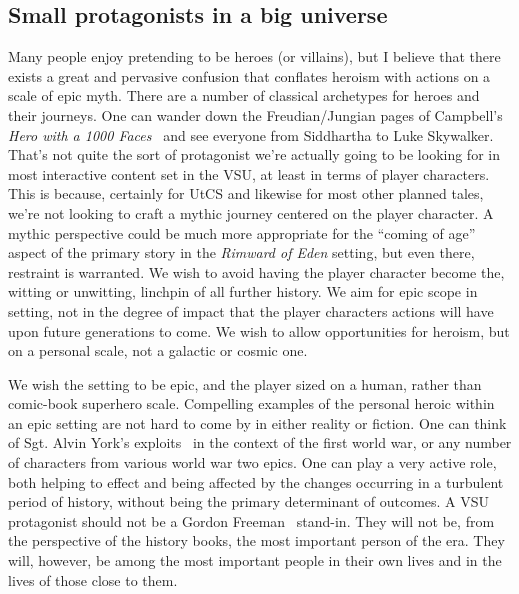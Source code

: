 \subsection{Small protagonists in a big universe}
Many people enjoy pretending to be heroes (or villains), but I believe
that there exists a great and pervasive confusion that conflates
heroism with actions on a scale of epic myth. There are a number of
classical archetypes for heroes and their journeys. One can wander
down the Freudian/Jungian pages of Campbell's {\em Hero with a 1000
Faces}~\cite{herowith1000faces} and see everyone from Siddhartha to
Luke Skywalker.  That's not quite the sort of protagonist we're
actually going to be looking for in most interactive content set in
the VSU, at least in terms of player characters. This is because,
certainly for UtCS and likewise for most other planned tales, we're
not looking to craft a mythic journey centered on the player
character. A mythic perspective could be much more appropriate for the ``coming of age'' aspect of the primary story in the {\it
Rimward of Eden} setting, but even there, restraint is warranted. We
wish to avoid having the player character become the, witting or
unwitting, linchpin of all further history. We aim for epic scope in
setting, not in the degree of impact that the player characters
actions will have upon future generations to come. We wish to allow
opportunities for heroism, but on a personal scale, not a galactic or
cosmic one.

We wish the setting to be epic, and the player sized on a human,
rather than comic-book superhero scale. Compelling examples of the
personal heroic within an epic setting are not hard to come by in
either reality or fiction. One can think of Sgt. Alvin York's
exploits~\cite{SergeantYork} in the context of the first world war, or
any number of characters from various world war two epics. One can
play a very active role, both helping to effect and being affected by
the changes occurring in a turbulent period of history, without being
the primary determinant of outcomes. A VSU protagonist should not be a
Gordon Freeman~\cite{Half-Life-GordonFreeman} stand-in. They will not
be, from the perspective of the history books, the most important
person of the era. They will, however, be among the most important
people in their own lives and in the lives of those close to them.

